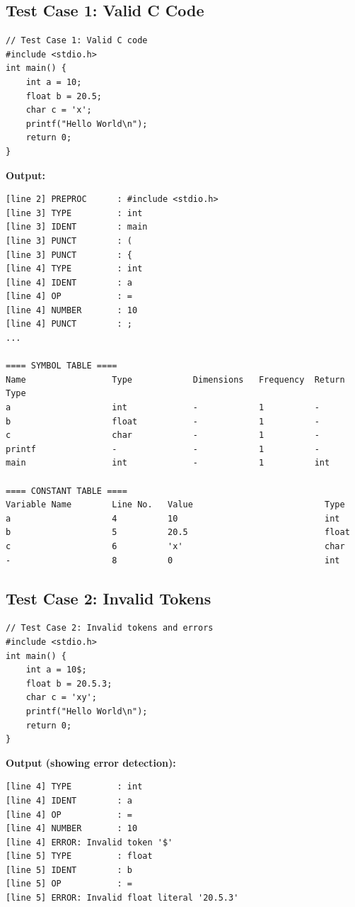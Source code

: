 \documentclass[12pt]{article}
\begin{document}
\subsection{Test Case 1: Valid C Code}

\begin{verbatim}
// Test Case 1: Valid C code
#include <stdio.h>
int main() {
    int a = 10;
    float b = 20.5;
    char c = 'x';
    printf("Hello World\n");
    return 0;
}
\end{verbatim}

\noindent
\textbf{Output:}
\begin{verbatim}
[line 2] PREPROC      : #include <stdio.h>
[line 3] TYPE         : int
[line 3] IDENT        : main
[line 3] PUNCT        : (
[line 3] PUNCT        : {
[line 4] TYPE         : int
[line 4] IDENT        : a
[line 4] OP           : =
[line 4] NUMBER       : 10
[line 4] PUNCT        : ;
...

==== SYMBOL TABLE ====
Name                 Type            Dimensions   Frequency  Return Type
a                    int             -            1          -
b                    float           -            1          -
c                    char            -            1          -
printf               -               -            1          -
main                 int             -            1          int

==== CONSTANT TABLE ====
Variable Name        Line No.   Value                          Type
a                    4          10                             int
b                    5          20.5                           float
c                    6          'x'                            char
-                    8          0                              int
\end{verbatim}

\subsection{Test Case 2: Invalid Tokens}

\begin{verbatim}
// Test Case 2: Invalid tokens and errors
#include <stdio.h>
int main() {
    int a = 10$;
    float b = 20.5.3;
    char c = 'xy';
    printf("Hello World\n");
    return 0;
}
\end{verbatim}

\noindent
\textbf{Output (showing error detection):}
\begin{verbatim}
[line 4] TYPE         : int
[line 4] IDENT        : a
[line 4] OP           : =
[line 4] NUMBER       : 10
[line 4] ERROR: Invalid token '$'
[line 5] TYPE         : float
[line 5] IDENT        : b
[line 5] OP           : =
[line 5] ERROR: Invalid float literal '20.5.3'
\end{verbatim}
\end{document}
